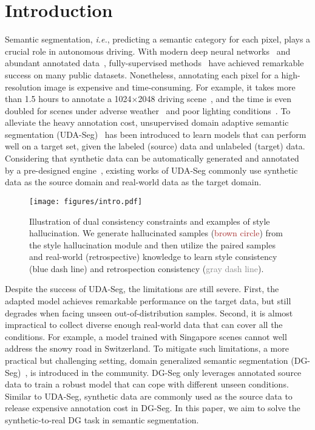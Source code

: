 \documentclass[runningheads]{llncs}
\def\ie{\emph{i.e.}} \def\Ie{\emph{I.e.}}
\begin{document}
\section{Introduction}
\begin{sloppypar}
Semantic segmentation, \ie, predicting a semantic category for each pixel, plays a crucial role in autonomous driving.
With modern deep neural networks~\cite{liu2021swin,liu2022convnet} and abundant annotated data~\cite{cityscapes,imagenet}, fully-supervised methods~\cite{deeplab,long2015fully,xie2021segformer} have achieved remarkable success on many public datasets. Nonetheless, annotating each pixel for a high-resolution image is expensive and time-consuming. For example, it takes more than 1.5 hours to annotate a 1024$\times$2048 driving scene~\cite{cityscapes}, and the time is even doubled for scenes under adverse weather~\cite{acdc} and poor lighting conditions~\cite{darkzurich}. 
To alleviate the heavy annotation cost, unsupervised domain adaptive semantic segmentation (UDA-Seg)~\cite{adaptseg,zhou2021context,zhou2021domain} has been introduced to learn models that can perform well on a target set, given the labeled (source) data and unlabeled (target) data. 
Considering that synthetic data can be automatically generated and annotated by a pre-designed engine~\cite{gtav,synthia}, existing works of UDA-Seg commonly use synthetic data as the source domain and real-world data as the target domain.
\end{sloppypar}

\begin{figure}[t]
    \centering
    \texttt{[image: figures/intro.pdf]}
    \caption{Illustration of dual consistency constraints and examples of style hallucination. We generate hallucinated samples (\textcolor{brown}{brown circle}) from the style hallucination module and then utilize the paired samples and real-world (retrospective) knowledge to learn style consistency (\textcolor{dark-blue}{blue dash line}) and retrospection consistency (\textcolor{gray}{gray dash line}).}
    \label{fig:intro}
\end{figure}

Despite the success of UDA-Seg, the limitations are still severe. First, the adapted model achieves remarkable performance on the target data, but  
still degrades when facing unseen out-of-distribution samples. Second, it is almost impractical to collect diverse enough real-world data that can cover all the conditions. 
For example, a model trained with Singapore scenes cannot well address the snowy road in Switzerland. 
To mitigate such limitations, a more practical but challenging setting, domain generalized semantic segmentation (DG-Seg)~\cite{robustnet,DRPC,zhong2022adversarial}, is introduced in the community. 
DG-Seg only leverages annotated source data to train a robust model that can cope with different unseen conditions. Similar to UDA-Seg, synthetic data are commonly used as the source data to release expensive annotation cost in DG-Seg. In this paper, we aim to solve the synthetic-to-real DG task in semantic segmentation.
\end{document}
